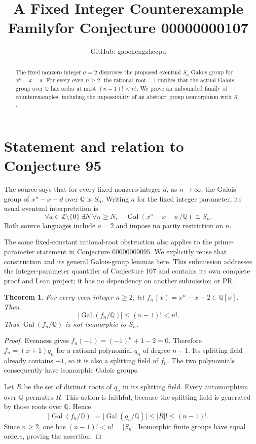 \documentclass[11pt]{article}
\title{A Fixed Integer Counterexample Family\newline for Conjecture 00000000107}
\author{GitHub: gaochengzhecpu}
\date{}
\newtheorem{theorem}{Theorem}
\newcommand{\Q}{\mathbb Q}
\newcommand{\Z}{\mathbb Z}
\newcommand{\Gal}{\operatorname{Gal}}
\begin{document}
\maketitle
\begin{abstract}
The fixed nonzero integer $a=2$ disproves the proposed eventual $S_n$ Galois group for $x^n-x-a$. For every even $n\ge2$, the rational root $-1$ implies that the actual Galois group over $\Q$ has order at most $(n-1)!<n!$. We prove an unbounded family of counterexamples, including the impossibility of an abstract group isomorphism with $S_n$.
\end{abstract}

\section*{Statement and relation to Conjecture 95}
The source says that for every fixed nonzero integer $d$, as $n\to\infty$, the Galois group of $x^n-x-d$ over $\Q$ is $S_n$. Writing $a$ for the fixed integer parameter, its usual eventual interpretation is
\[
 \forall a\in\Z\setminus\{0\}\ \exists N\ \forall n\ge N,\quad
 \Gal(x^n-x-a\,/\Q)\cong S_n.
\]
Both source languages include $a=2$ and impose no parity restriction on $n$.

The same fixed-constant rational-root obstruction also applies to the prime-parameter statement in Conjecture 00000000095. We explicitly reuse that construction and its general Galois-group lemmas here. This submission addresses the integer-parameter quantifier of Conjecture 107 and contains its own complete proof and Lean project; it has no dependency on another submission or PR.

\begin{theorem}\label{thm:counter}
For every even integer $n\ge2$, let $f_n(x)=x^n-x-2\in\Q[x]$. Then
\[
 \bigl|\Gal(f_n/\Q)\bigr|\le(n-1)!<n!.
\]
Thus $\Gal(f_n/\Q)$ is not isomorphic to $S_n$.
\end{theorem}
\begin{proof}
Evenness gives $f_n(-1)=(-1)^n+1-2=0$. Therefore $f_n=(x+1)q_n$ for a rational polynomial $q_n$ of degree $n-1$. Its splitting field already contains $-1$, so it is also a splitting field of $f_n$. The two polynomials consequently have isomorphic Galois groups.

Let $R$ be the set of distinct roots of $q_n$ in its splitting field. Every automorphism over $\Q$ permutes $R$. This action is faithful, because the splitting field is generated by those roots over $\Q$. Hence
\[
 \bigl|\Gal(f_n/\Q)\bigr|
 =\bigl|\Gal(q_n/\Q)\bigr|
 \le |R|!\le(n-1)!.
\]
Since $n\ge2$, one has $(n-1)!<n!=|S_n|$. Isomorphic finite groups have equal orders, proving the assertion.
\end{proof}
\end{document}
